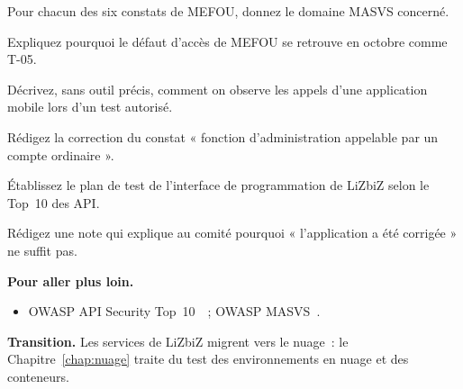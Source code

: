 \begin{boxexo}[title={\ding{45}\quad Exercice~16.5. MASVS \niveaumoyen}]
Pour chacun des six constats de MEFOU, donnez le domaine MASVS concerné.
\end{boxexo}

\begin{boxexo}[title={\ding{45}\quad Exercice~16.6. MEFOU vers T-05 \niveaumoyen}]
Expliquez pourquoi le défaut d'accès de MEFOU se retrouve en octobre comme
T-05.
\end{boxexo}

\begin{boxexo}[title={\ding{45}\quad Exercice~16.7. Interception \niveaumoyen}]
Décrivez, sans outil précis, comment on observe les appels d'une application
mobile lors d'un test autorisé.
\end{boxexo}

\begin{boxexo}[title={\ding{45}\quad Exercice~16.8. Correction \niveaumoyen}]
Rédigez la correction du constat « fonction d'administration appelable par
un compte ordinaire ».
\end{boxexo}

\begin{boxexo}[title={\ding{45}\quad Exercice~16.9. Plan API \niveauexpert}]
Établissez le plan de test de l'interface de programmation de LiZbiZ selon
le Top~10 des API.
\end{boxexo}

\begin{boxexo}[title={\ding{45}\quad Exercice~16.10. Note au comité \niveauexpert}]
Rédigez une note qui explique au comité pourquoi « l'application a été
corrigée » ne suffit pas.
\end{boxexo}

\bigskip

\begin{boxinfo}
\textbf{Pour aller plus loin.}
\begin{itemize}
    \item OWASP API Security Top~10~\cite{owaspapitop10}~; OWASP
          MASVS~\cite{owaspmasvs}.
\end{itemize}
\end{boxinfo}

\begin{boxinfo}
\textbf{Transition.} Les services de LiZbiZ migrent vers le nuage~: le
Chapitre~\ref{chap:nuage} traite du test des environnements en nuage et des
conteneurs.
\end{boxinfo}
